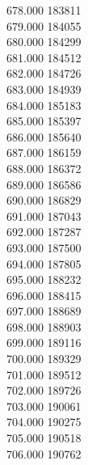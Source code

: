 { 678.000	183811 \\
 679.000	184055 \\
 680.000	184299 \\
 681.000	184512 \\
 682.000	184726 \\
 683.000	184939 \\
 684.000	185183 \\
 685.000	185397 \\
 686.000	185640 \\
 687.000	186159 \\
 688.000	186372 \\
 689.000	186586 \\
 690.000	186829 \\
 691.000	187043 \\
 692.000	187287 \\
 693.000	187500 \\
 694.000	187805 \\
 695.000	188232 \\
 696.000	188415 \\
 697.000	188689 \\
 698.000	188903 \\
 699.000	189116 \\
 700.000	189329 \\
 701.000	189512 \\
 702.000	189726 \\
 703.000	190061 \\
 704.000	190275 \\
 705.000	190518 \\
 706.000	190762 \\
}
